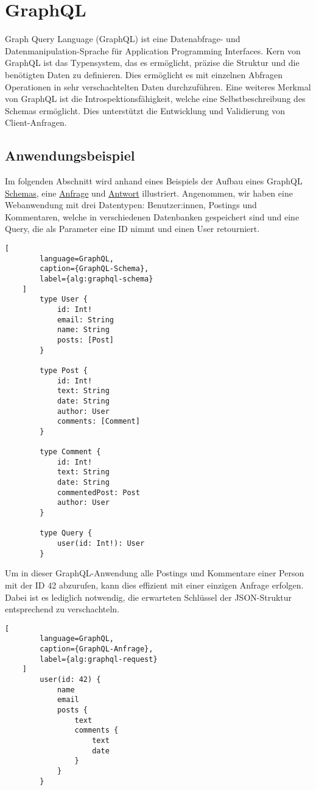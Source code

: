 \documentclass[draft,final]{vutinfth} %
\begin{document}
\section{GraphQL}

Graph Query Language (GraphQL) ist eine Datenabfrage- und Datenmanipulation-Sprache für Application Programming Interfaces. 
Kern von GraphQL ist das Typensystem, das es ermöglicht, präzise die Struktur und die benötigten Daten zu definieren. Dies ermöglicht es mit einzelnen Abfragen Operationen in sehr verschachtelten Daten durchzuführen.
Eine weiteres Merkmal von GraphQL ist die Introspektionsfähigkeit, welche eine Selbstbeschreibung des Schemas ermöglicht.
Dies unterstützt die Entwicklung und Validierung von Client-Anfragen.


\subsection{Anwendungsbeispiel}

Im folgenden Abschnitt wird anhand eines Beispiels der Aufbau eines GraphQL \hyperref[alg:graphql-schema]{Schemas}, eine \hyperref[alg:graphql-request]{Anfrage} und \hyperref[alg:graphql-response]{Antwort} illustriert.
Angenommen, wir haben eine Webanwendung mit drei Datentypen: Benutzer:innen, Postings und Kommentaren, welche in verschiedenen Datenbanken gespeichert sind und eine Query, die als Parameter eine ID nimmt und einen User retourniert.

\begin{lstlisting}[
		language=GraphQL, 
		caption={GraphQL-Schema}, 
		label={alg:graphql-schema}
	]
		type User {
			id: Int!
			email: String
			name: String
			posts: [Post]
		}
		
		type Post {
			id: Int!
			text: String
			date: String
			author: User
			comments: [Comment]
		}
		
		type Comment {
			id: Int!
			text: String
			date: String
			commentedPost: Post
			author: User
		}
		
		type Query {
			user(id: Int!): User
		}
\end{lstlisting}

Um in dieser GraphQL-Anwendung alle Postings und Kommentare einer Person mit der ID 42 abzurufen, kann dies effizient mit einer einzigen Anfrage erfolgen. 
Dabei ist es lediglich notwendig, die erwarteten Schlüssel der JSON-Struktur entsprechend zu verschachteln.

\begin{lstlisting}[
		language=GraphQL, 
		caption={GraphQL-Anfrage}, 
		label={alg:graphql-request}
	]
		user(id: 42) {
			name
			email
			posts {
				text
				comments {
					text
					date
				}
			}
		}
\end{lstlisting}
\end{document}
